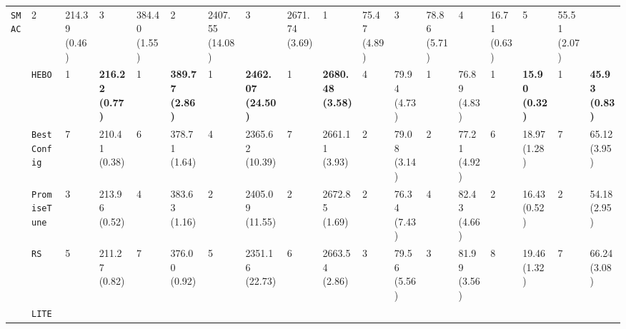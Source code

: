 \begin{tabular}{clllllllllllllllll}
  \multicolumn{1}{l|}{\texttt{SMAC}} &
  2 &
  \multicolumn{1}{l|}{214.39 (0.46)} &
  3 &
  \multicolumn{1}{l|}{384.40 (1.55)} &
  2 &
  \multicolumn{1}{l|}{2407.55 (14.08)} &
  3 &
  \multicolumn{1}{l|}{2671.74 (3.69)} &
  \cellcolor{blue!15}1 &
  \multicolumn{1}{l|}{\cellcolor{blue!15}75.47 (4.89)} &
  3 &
  \multicolumn{1}{l|}{78.86 (5.71)} &
  4 &
  \multicolumn{1}{l|}{16.71 (0.63)} &
  5 &
  55.51 (2.07) \\
\multicolumn{1}{c|}{} &
  \multicolumn{1}{l|}{\texttt{HEBO}} &
  \cellcolor{blue!15}1 &
  \multicolumn{1}{l|}{\cellcolor{blue!15}\textbf{216.22 (0.77)}} &
  \cellcolor{blue!15}1 &
  \multicolumn{1}{l|}{\cellcolor{blue!15}\textbf{389.77 (2.86)}} &
  \cellcolor{blue!15}1 &
  \multicolumn{1}{l|}{\cellcolor{blue!15}\textbf{2462.07 (24.50)}} &
  \cellcolor{blue!15}1 &
  \multicolumn{1}{l|}{\cellcolor{blue!15}\textbf{2680.48 (3.58)}} &
  4 &
  \multicolumn{1}{l|}{79.94 (4.73)} &
  \cellcolor{blue!15}1 &
  \multicolumn{1}{l|}{\cellcolor{blue!15}76.89 (4.83)} &
  \cellcolor{blue!15}1 &
  \multicolumn{1}{l|}{\cellcolor{blue!15}\textbf{15.90 (0.32)}} &
  \cellcolor{blue!15}1 &
  \cellcolor{blue!15}\textbf{45.93 (0.83)} \\
\multicolumn{1}{c|}{} &
  \multicolumn{1}{l|}{\texttt{BestConfig}} &
  7 &
  \multicolumn{1}{l|}{210.41 (0.38)} &
  6 &
  \multicolumn{1}{l|}{378.71 (1.64)} &
  4 &
  \multicolumn{1}{l|}{2365.62 (10.39)} &
  7 &
  \multicolumn{1}{l|}{2661.11 (3.93)} &
  2 &
  \multicolumn{1}{l|}{79.08 (3.14)} &
  2 &
  \multicolumn{1}{l|}{77.21 (4.92)} &
  6 &
  \multicolumn{1}{l|}{18.97 (1.28)} &
  7 &
  65.12 (3.95) \\
\multicolumn{1}{c|}{} &
  \multicolumn{1}{l|}{\texttt{PromiseTune}} &
  3 &
  \multicolumn{1}{l|}{213.96 (0.52)} &
  4 &
  \multicolumn{1}{l|}{383.63 (1.16)} &
  2 &
  \multicolumn{1}{l|}{2405.09 (11.55)} &
  2 &
  \multicolumn{1}{l|}{2672.85 (1.69)} &
  2 &
  \multicolumn{1}{l|}{76.34 (7.43)} &
  4 &
  \multicolumn{1}{l|}{82.43 (4.66)} &
  2 &
  \multicolumn{1}{l|}{16.43 (0.52)} &
  2 &
  54.18 (2.95) \\
\multicolumn{1}{c|}{} &
  \multicolumn{1}{l|}{\texttt{RS}} &
  5 &
  \multicolumn{1}{l|}{211.27 (0.82)} &
  7 &
  \multicolumn{1}{l|}{376.00 (0.92)} &
  5 &
  \multicolumn{1}{l|}{2351.16 (22.73)} &
  6 &
  \multicolumn{1}{l|}{2663.54 (2.86)} &
  3 &
  \multicolumn{1}{l|}{79.56 (5.56)} &
  3 &
  \multicolumn{1}{l|}{81.99 (3.56)} &
  8 &
  \multicolumn{1}{l|}{19.46 (1.32)} &
  7 &
  66.24 (3.08) \\
\multicolumn{1}{c|}{} &
  \multicolumn{1}{l|}{\texttt{LITE}} &

\end{tabular}
